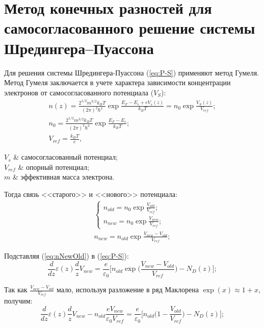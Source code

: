 \section{Метод конечных разностей для самосогласованного решение системы Шредингера--Пуассона}
Для решения системы Шредингера-Пуассона (\ref{eq:P-S}) применяют метод Гумеля. Метод Гумеля заключается в учете характера зависимости концентрации электронов от самосогласованного потенциала ($V_{S}$):
\begin{gather}
	n(z) = \frac{2^{1/2}m^{3/2}k_{B}T}{(2\pi)^{2}\hbar^{3}} \exp \frac{E_{F} - E_{c} +eV_{s}(z)}{k_{B}T} = n_{0}\exp\frac{V_{S}(z)}{V_{ref}};\\
	n_{0} = \frac{2^{1/2}m^{3/2}k_{B}T}{(2\pi)^{2}\hbar^{3}} \exp \frac{E_{F} - E_{c} }{k_{B}T};\\
	V_{ref} = \frac{k_{B}T}{e},
\end{gather}
\begin{conditions}
	$V_{s}$ & самосогласованный потенциал;\\
	$V_{ref}$ & опорный потенциал;\\
	$m$ & эффективная масса электрона.
\end{conditions}
Тогда связь <<старого>> и <<нового>> потенциала:
\begin{gather}
	\begin{cases}
		n_{old} = n_{0}\exp\frac{V_{old}}{V_{ref}};\\
		n_{new} = n_{0}\exp\frac{V_{new}}{V_{ref}};
	\end{cases}\\
	\label{eq:nNewOld}
	n_{new} = n_{old}\exp\frac{V_{new} - V_{old}}{V_{ref}};
\end{gather}

Подставляя (\ref{eq:nNewOld}) в (\ref{eq:P-S}):
\begin{equation}
 	\frac{d}{dz}\varepsilon(z)\frac{d}{z}V_{new} = \frac{e}{\varepsilon_{0}}\bigg[n_{old}\exp\bigg( \frac{V_{new} - V_{old}}{V_{ref}} \bigg) - N_{D}(z)\bigg];
\end{equation}

Так как $\frac{V_{new} - V_{old}}{V_{ref}}$ мало, используя разложение в ряд Маклорена $\exp(x) \approx 1 + x$, получим:
\begin{equation}
	\frac{d}{dz}\varepsilon(z)\frac{d}{z}V_{new} - n_{old}\frac{eV_{new}}{\varepsilon_{0}V_{ref}} = \frac{e}{\varepsilon_{0}}\bigg[n_{old}\bigg( 1 - \frac{V_{old}}{V_{ref}} \bigg) - N_{D}(z)\bigg];
\end{equation}

